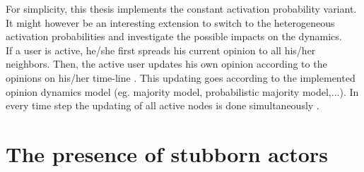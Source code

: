 \documentclass[11 pt , letterpaper , twoside , openright]{book}
\begin{document}
\newline
For simplicity, this thesis implements the constant activation probability variant. It might however be an interesting extension to switch to the heterogeneous activation probabilities and investigate the possible impacts on the dynamics. \\
\newline
If a user is active, he/she first spreads his current opinion to all his/her neighbors. Then, the active user updates his own opinion according to the opinions on his/her time-line \cite{Perra2019}. This updating goes according to the implemented opinion dynamics model (eg. majority model, probabilistic majority model,...). In every time step the updating of all active nodes is done simultaneously \cite{Perra2019}.


\section{The presence of stubborn actors}\label{stubb}
\end{document}
